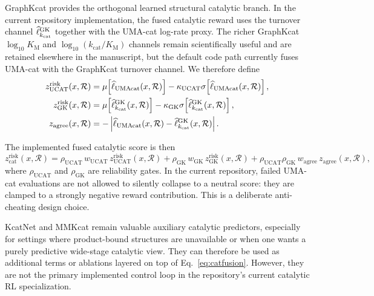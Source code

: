\documentclass[11pt]{article}
\newcommand{\logKm}{\ensuremath{\log_{10} K_{\mathrm M}}}
\newcommand{\logeff}{\ensuremath{\log_{10}(k_{\mathrm{cat}}/K_{\mathrm M})}}
\begin{document}
	GraphKcat provides the orthogonal learned structural catalytic branch. In the current repository implementation, the fused catalytic reward uses the turnover channel $\widehat \ell_{k_{\rm cat}}^{\mathrm{GK}}$ together with the UMA-cat log-rate proxy. The richer GraphKcat $\logKm$ and $\logeff$ channels remain scientifically useful and are retained elsewhere in the manuscript, but the default code path currently fuses UMA-cat with the GraphKcat turnover channel. We therefore define
	\begin{align}
		z_{\mathrm{UCAT}}^{\mathrm{risk}}(x,\mathcal{R})
		&=
		\mu\!\left[\widehat \ell_{\mathrm{UMAcat}}(x,\mathcal{R})\right]
		-
		\kappa_{\mathrm{UCAT}}\sigma\!\left[\widehat \ell_{\mathrm{UMAcat}}(x,\mathcal{R})\right],\\
		z_{\mathrm{GK}}^{\mathrm{risk}}(x,\mathcal{R})
		&=
		\mu\!\left[\widehat \ell_{k_{\rm cat}}^{\mathrm{GK}}(x,\mathcal{R})\right]
		-
		\kappa_{\mathrm{GK}}\sigma\!\left[\widehat \ell_{k_{\rm cat}}^{\mathrm{GK}}(x,\mathcal{R})\right],\\
		z_{\mathrm{agree}}(x,\mathcal{R})
		&=
		-\left|
		\widehat \ell_{\mathrm{UMAcat}}(x,\mathcal{R})
		-
		\widehat \ell_{k_{\rm cat}}^{\mathrm{GK}}(x,\mathcal{R})
		\right|.
	\end{align}
	
	The implemented fused catalytic score is then
	\begin{equation}
		\label{eq:catfusion}
		z_{\mathrm{cat}}^{\mathrm{risk}}(x,\mathcal{R})
		=
		\rho_{\mathrm{UCAT}}\,w_{\mathrm{UCAT}}\,z_{\mathrm{UCAT}}^{\mathrm{risk}}(x,\mathcal{R})
		+
		\rho_{\mathrm{GK}}\,w_{\mathrm{GK}}\,z_{\mathrm{GK}}^{\mathrm{risk}}(x,\mathcal{R})
		+
		\rho_{\mathrm{UCAT}}\rho_{\mathrm{GK}}\,w_{\mathrm{agree}}\,z_{\mathrm{agree}}(x,\mathcal{R}),
	\end{equation}
	where $\rho_{\mathrm{UCAT}}$ and $\rho_{\mathrm{GK}}$ are reliability gates. In the current repository, failed UMA-cat evaluations are not allowed to silently collapse to a neutral score: they are clamped to a strongly negative reward contribution. This is a deliberate anti-cheating design choice.
	
	KcatNet and MMKcat remain valuable auxiliary catalytic predictors, especially for settings where product-bound structures are unavailable or when one wants a purely predictive wide-stage catalytic view. They can therefore be used as additional terms or ablations layered on top of Eq.~\eqref{eq:catfusion}. However, they are not the primary implemented control loop in the repository's current catalytic RL specialization.
	
\end{document}
